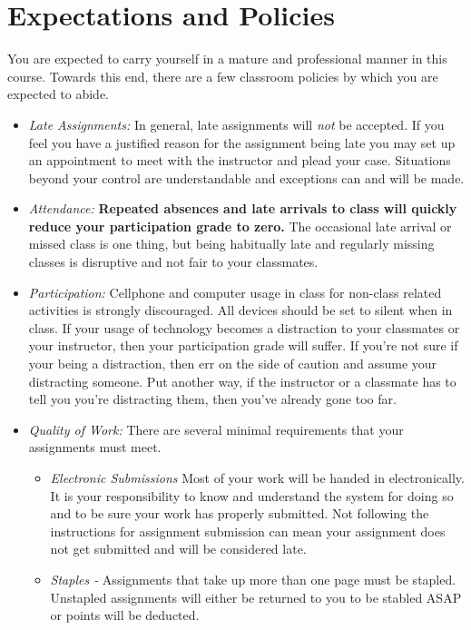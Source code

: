 \documentclass[10pt]{article}
\begin{document}
\section{Expectations and Policies}

You are expected to carry yourself in a mature and professional manner in this course. Towards this end, there are a few classroom policies by which you are expected to abide.
\begin{itemize}

\item \textit{Late Assignments: } In general, late assignments will \textit{not} be accepted.  If you feel you have a justified reason for the assignment being late you may set up an appointment to meet with the instructor and plead your case.  Situations beyond your control are understandable and exceptions can and will be made. 

\item \textit{Attendance: } \textbf{Repeated absences and late arrivals to class will quickly reduce your participation grade to zero.}  The occasional late arrival or missed class is one thing, but being habitually late and regularly missing classes is disruptive and not fair to your classmates.  

\item \textit{Participation: }  Cellphone and computer usage in class for non-class related activities is strongly discouraged.  All devices should be set to silent when in class.  If your usage of technology becomes a distraction to your classmates or your instructor, then your participation grade will suffer.  If you're not sure if your being a distraction, then err on the side of caution and assume your distracting someone.  Put another way, if the instructor or a classmate has to tell you you're distracting them, then you've already gone too far. 

\item \textit{Quality of Work:} There are several minimal requirements that your assignments must meet.
\begin{itemize}
\item \textit{Electronic Submissions}  Most of your work will be handed in electronically.  It is your responsibility to know and understand the system for doing so and to be sure your work has properly submitted. Not following the instructions for assignment submission can mean your assignment does not get submitted and will be considered late. 

\item \textit{Staples - } Assignments that take up more than one page must be stapled.  Unstapled assignments will either be returned to you to be stabled ASAP or points will be deducted.  


\end{itemize}
\end{itemize}
\end{document}
